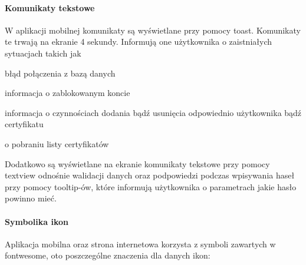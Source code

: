 		\paragraph*{Komunikaty tekstowe}
			 W aplikacji mobilnej komunikaty są wyświetlane przy pomocy toast. Komunikaty te  trwają na ekranie 4 sekundy. Informują one użytkownika o zaistniałych sytuacjach takich jak
			 \begin{itemize*}
			 	\item błąd połączenia z bazą danych
			 	\item informacja o zablokowanym koncie 
			 	\item informacja o czynnościach dodania bądź usunięcia odpowiednio użytkownika bądź certyfikatu
			 	\item o pobraniu listy certyfikatów
			 \end{itemize*}
		 
		 Dodatkowo są wyświetlane na ekranie komunikaty tekstowe przy pomocy  textview odnośnie walidacji danych oraz podpowiedzi podczas wpisywania haseł przy pomocy tooltip-ów, które informują użytkownika o parametrach jakie hasło powinno mieć.
		 
		\paragraph*{Symbolika ikon}
		Aplikacja mobilna oraz strona internetowa korzysta z symboli zawartych w fontwesome, oto poszczególne znaczenia dla danych ikon:
	  
